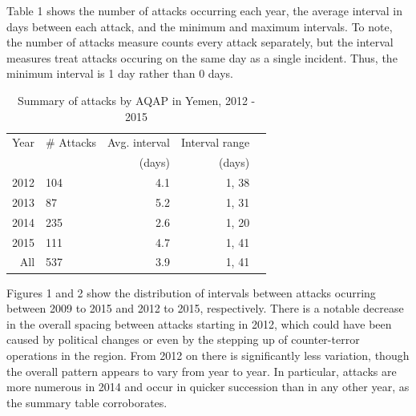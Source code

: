 \documentclass[letterpaper,12pt]{article}
\theoremstyle{definition}
\begin{document}
Table 1 shows the number of attacks occurring each year, the average interval in days between each attack, and the minimum and maximum intervals. To note, the number of attacks measure counts every attack separately, but the interval measures treat attacks occuring on the same day as a single incident. Thus, the minimum interval is 1 day rather than 0 days.\\

\begin {table}[H]
\begin{center}
\caption {Summary of attacks by AQAP in Yemen, 2012 - 2015}
\begin{tabular}{rlrrl}
  \hline
Year & \# Attacks & Avg. interval & Interval range \\ 
&&(days)&(days)\\
  \hline
2012 & 104 & 4.1 & 1, 38 \\ 
  2013 &  87 & 5.2 & 1, 31 \\ 
  2014 & 235 & 2.6 & 1, 20 \\ 
  2015 & 111 & 4.7 & 1, 41 \\ 
  \hline
  All & 537 & 3.9 & 1, 41 \\ 
   \hline
\end{tabular}
\end{center}
\end {table}

Figures 1 and 2 show the distribution of intervals between attacks ocurring between 2009 to 2015 and 2012 to 2015, respectively. There is a notable decrease in the overall spacing between attacks starting in 2012, which could have been caused by political changes or even by the stepping up of counter-terror operations in the region. From 2012 on there is significantly less variation, though the overall pattern appears to vary from year to year. In particular, attacks are more numerous in 2014 and occur in quicker succession than in any other year, as the summary table corroborates.
\end{document}
